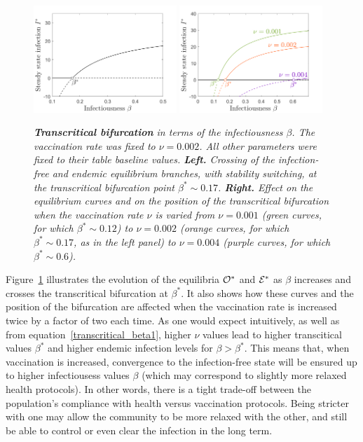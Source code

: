 \documentclass[10pt]{article}
\begin{document}
\begin{figure}[h!]
\begin{center}
\includegraphics[width=0.48\textwidth]{figures/transcritical_scheme1}
\includegraphics[width=0.48\textwidth]{figures/transcritical_scheme1_examples.png}
\end{center}
\caption{\emph{{\bf Transcritical bifurcation} in terms of the infectiousness $\beta$. The vaccination rate was fixed to $\nu=0.002$. All other parameters were fixed to their table baseline values. {\bf Left.} Crossing of the infection-free and endemic equilibrium branches, with stability switching, at the transcritical bifurcation point $\beta^* \sim 0.17$. {\bf Right.} Effect on the equilibrium curves and on the position of the transcritical bifurcation when the vaccination rate $\nu$ is varied from $\nu = 0.001$ (green curves, for which $\beta^* \sim 0.12$) to $\nu=0.002$ (orange curves, for which $\beta^* \sim 0.17$, as in the left panel) to $\nu=0.004$ (purple curves, for which $\beta^* \sim 0.6$).}}
\label{transcritical_scheme1}
\end{figure}

Figure~\ref{transcritical_scheme1} illustrates the evolution of the equilibria ${\cal O}^*$ and ${\cal E}^*$ as $\beta$ increases and crosses the transcritical bifurcation at $\beta ^*$. It also shows how these curves and the position of the bifurcation are affected when the vaccination rate is increased twice by a factor of two each time. As one would expect intuitively, as well as from equation~\ref{transcritical_beta1}, higher $\nu$ values lead to higher transcitical values $\beta^*$ and higher endemic infection levels for $\beta>\beta^*$. This means that, when vaccination is increased, convergence to the infection-free state will be ensured up to higher infectiousess values $\beta$ (which may correspond to slightly more relaxed health protocols). In other words, there is a tight trade-off between the population's compliance with health versus vaccination protocols. Being stricter with one may allow the community to be more relaxed with the other, and still be able to control or even clear the infection in the long term.
\end{document}

